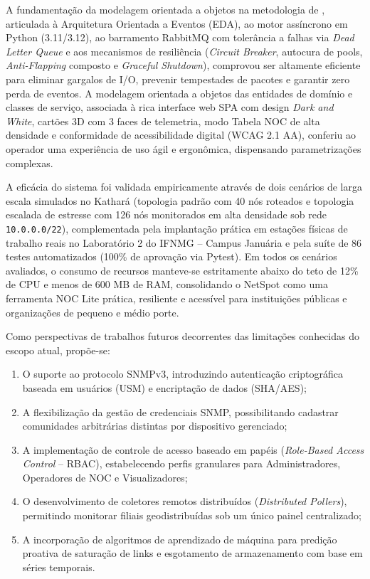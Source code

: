 \documentclass[12pt,a4paper]{article}
\begin{document}
A fundamentação da modelagem orientada a objetos na metodologia de , articulada à Arquitetura Orientada a Eventos (EDA), ao motor assíncrono em Python (3.11/3.12), ao barramento RabbitMQ com tolerância a falhas via \textit{Dead Letter Queue} e aos mecanismos de resiliência (\textit{Circuit Breaker}, autocura de pools, \textit{Anti-Flapping} composto e \textit{Graceful Shutdown}), comprovou ser altamente eficiente para eliminar gargalos de I/O, prevenir tempestades de pacotes e garantir zero perda de eventos. A modelagem orientada a objetos das entidades de domínio e classes de serviço, associada à rica interface web SPA com design \textit{Dark and White}, cartões 3D com 3 faces de telemetria, modo Tabela NOC de alta densidade e conformidade de acessibilidade digital (WCAG 2.1 AA), conferiu ao operador uma experiência de uso ágil e ergonômica, dispensando parametrizações complexas.

A eficácia do sistema foi validada empiricamente através de dois cenários de larga escala simulados no Kathará (topologia padrão com 40 nós roteados e topologia escalada de estresse com 126 nós monitorados em alta densidade sob rede \texttt{10.0.0.0/22}), complementada pela implantação prática em estações físicas de trabalho reais no Laboratório 2 do IFNMG -- Campus Januária e pela suíte de 86 testes automatizados (100\% de aprovação via Pytest). Em todos os cenários avaliados, o consumo de recursos manteve-se estritamente abaixo do teto de 12\% de CPU e menos de 600 MB de RAM, consolidando o NetSpot como uma ferramenta NOC Lite prática, resiliente e acessível para instituições públicas e organizações de pequeno e médio porte.

Como perspectivas de trabalhos futuros decorrentes das limitações conhecidas do escopo atual, propõe-se:
\begin{enumerate}[leftmargin=1.25cm]
\item O suporte ao protocolo SNMPv3, introduzindo autenticação criptográfica baseada em usuários (USM) e encriptação de dados (SHA/AES);
\item A flexibilização da gestão de credenciais SNMP, possibilitando cadastrar comunidades arbitrárias distintas por dispositivo gerenciado;
\item A implementação de controle de acesso baseado em papéis (\textit{Role-Based Access Control} -- RBAC), estabelecendo perfis granulares para Administradores, Operadores de NOC e Visualizadores;
\item O desenvolvimento de coletores remotos distribuídos (\textit{Distributed Pollers}), permitindo monitorar filiais geodistribuídas sob um único painel centralizado;
\item A incorporação de algoritmos de aprendizado de máquina para predição proativa de saturação de links e esgotamento de armazenamento com base em séries temporais.
\end{enumerate}

\clearpage
{}


\end{document}
